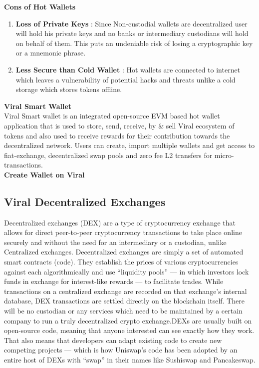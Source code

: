\documentclass[10pt]{article}
\begin{document}
\textbf{Cons of Hot Wallets}
\begin{enumerate}[leftmargin=+0.2in]
\item \textbf{Loss of Private Keys} : Since Non-custodial wallets are decentralized user will hold his private keys and no banks or intermediary custodians will hold on behalf of them. This puts an undeniable risk of losing a cryptographic key or a mnemonic phrase.
\item \textbf{Less Secure than Cold Wallet} : Hot wallets are connected to internet which leaves a vulnerability of potential hacks and threats unlike a cold storage which stores tokens offline.
\end{enumerate}


\textbf{Viral Smart Wallet}\\

Viral Smart wallet is an integrated open-source EVM based hot wallet application that is used to store, send, receive, by \& sell Viral ecosystem of tokens and also used to receive rewards for their contribution towards the decentralized network. Users can create, import multiple wallets and get access to fiat-exchange, decentralized swap pools and zero fee L2 transfers for micro-transactions. \\

\textbf{Create Wallet on Viral}\\




\subsection{Viral Decentralized Exchanges}

Decentralized exchanges (DEX) are a type of cryptocurrency exchange that allows for direct peer-to-peer cryptocurrency transactions to take place online securely and without the need for an intermediary or a custodian, unlike Centralized exchanges. Decentralized exchanges are simply a set of automated smart contracts (code). They establish the prices of various cryptocurrencies against each algorithmically and use “liquidity pools” — in which investors lock funds in exchange for interest-like rewards — to facilitate trades. While transactions on a centralized exchange are recorded on that exchange’s internal database, DEX transactions are settled directly on the blockchain itself. There will be no custodian or any services which need to be maintained by a certain company to run a truly decentralized crypto exchange.DEXs are usually built on open-source code, meaning that anyone interested can see exactly how they work. That also means that developers can adapt existing code to create new competing projects — which is how Uniswap’s code has been adopted by an entire host of DEXs with “swap” in their names like Sushiswap and Pancakeswap.\\
\end{document}
